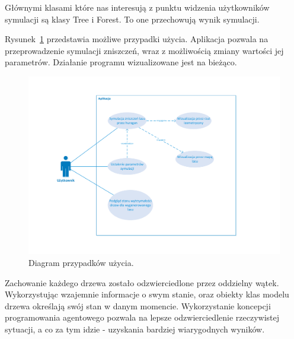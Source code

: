 Głównymi klasami które nas interesują z punktu widzenia użytkowników symulacji są klasy Tree i Forest. To one przechowują wynik symulacji.

 Rysunek~\ref{fig:uml2} przedstawia możliwe przypadki użycia. Aplikacja pozwala na przeprowadzenie symulacji zniszczeń, wraz z możliwością zmiany wartości jej parametrów. Działanie programu wizualizowane jest na bieżąco.

\begin{figure}[!h]
	\center
	\includegraphics[scale=0.5]{uml_use_case}
	\caption{Diagram przypadków użycia.}
	\label{fig:uml2}
\end{figure} 

Zachowanie każdego drzewa zostało odzwierciedlone przez oddzielny wątek. Wykorzystując wzajemnie informacje o swym stanie, oraz obiekty klas modelu drzewa określają swój stan w danym momencie. Wykorzystanie koncepcji programowania agentowego pozwala na lepsze odzwierciedlenie rzeczywistej sytuacji, a co za tym idzie - uzyskania bardziej wiarygodnych wyników.





